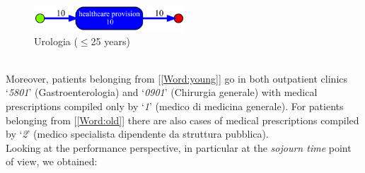 \begin{figure} [htbp]
\centering
\includegraphics[width=0.5\textwidth]{AmbulatoriInductiveVisualMinerYoungs4301}
\caption{Urologia ($\leq$25 years)}
\end{figure}\\
Moreover, patients belonging from [\ref{Word:young}] go in both outpatient clinics `\textit{5801}' (Gastroenterologia) and `\textit{0901}' (Chirurgia generale) with medical prescriptions compiled only by `\textit{1}' (medico di medicina generale). For patients belonging from [\ref{Word:old}] there are also cases of medical prescriptions compiled by `\textit{2}' (medico specialista dipendente da struttura pubblica).\\
Looking at the performance perspective, in particular at the \textit{sojourn time} point of view, we obtained:
